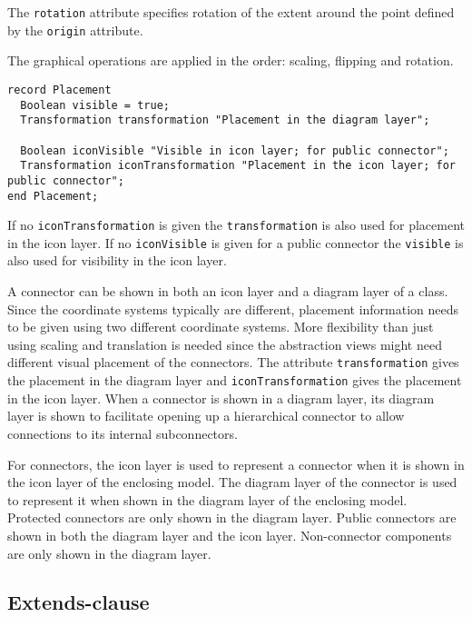 The \lstinline!rotation! attribute specifies rotation of the extent around the point defined by the \lstinline!origin! attribute.

The graphical operations are applied in the order: scaling, flipping and rotation.

\begin{lstlisting}[language=modelica]
record Placement
  Boolean visible = true;
  Transformation transformation "Placement in the diagram layer";

  Boolean iconVisible "Visible in icon layer; for public connector";
  Transformation iconTransformation "Placement in the icon layer; for public connector";
end Placement;
\end{lstlisting}%
If no \lstinline!iconTransformation! is given the \lstinline!transformation! is also used for placement in the icon layer.
If no \lstinline!iconVisible! is given for a public connector the \lstinline!visible! is also used for visibility in the icon layer.

\begin{nonnormative}
A connector can be shown in both an icon layer and a diagram
layer of a class. Since the coordinate systems typically are different,
placement information needs to be given using two different coordinate
systems. More flexibility than just using scaling and translation is
needed since the abstraction views might need different visual placement
of the connectors. The attribute \lstinline!transformation! gives the placement in
the diagram layer and \lstinline!iconTransformation! gives the placement in the icon
layer. When a connector is shown in a diagram layer, its diagram layer
is shown to facilitate opening up a hierarchical connector to allow
connections to its internal subconnectors.
\end{nonnormative}

For connectors, the icon layer is used to represent a connector when it
is shown in the icon layer of the enclosing model. The diagram layer of
the connector is used to represent it when shown in the diagram layer of
the enclosing model. Protected connectors are only shown in the diagram
layer. Public connectors are shown in both the diagram layer and the
icon layer. Non-connector components are only shown in the diagram
layer.

\subsection{Extends-clause}\label{extends-clause}

